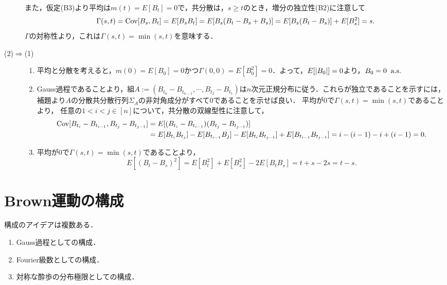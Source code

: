\documentclass[uplatex,dvipdfmx]{jsreport}
\begin{document}
\begin{Proof}
\begin{description}
        また，仮定(B3)より平均は$m(t)=E[B_t]=0$で，共分散は，$s\ge t$のとき，増分の独立性(B2)に注意して
        \[\Gamma(s,t)=\mathrm{Cov}[B_s,B_t]=E[B_sB_t]=E[B_s(B_t-B_s+B_s)]=E[B_s(B_t-B_s)]+E[B_s^2]=s.\]
        $\Gamma$の対称性より，これは$\Gamma(s,t)=\min(s,t)$を意味する．
        \item[(2)$\Rightarrow$(1)]
        \begin{enumerate}[({B}1)]
            \item 平均と分散を考えると，$m(0)=E[B_0]=0$かつ$\Gamma(0,0)=E[B_0^2]=0$．よって，$E[\lvert B_0\rvert]=0$より，$B_0=0\;\;\mathrm{a.s.}$
            \item Gauss過程であることより，組$A:=(B_{t_n}-B_{t_{n-1}},\cdots,B_{t_2}-B_{t_1})$は$n$次元正規分布に従う．これらが独立であることを示すには，補題より$A$の分散共分散行列$\Sigma_A$の非対角成分がすべて$0$であることを示せば良い．
            平均が$0$で$\Gamma(s,t)=\min(s,t)$であることより，
            任意の$1<i< j\in[n]$について，共分散の双線型性に注意して，
            \begin{align*}
                \mathrm{Cov}[B_{t_i}-B_{t_{i-1}},B_{t_j}-B_{t_{j-1}}]&=E[(B_{t_i}-B_{t_{i-1}})(B_{t_j}-B_{t_{j-1}})]\\
                &=E[B_{t_i}B_{t_j}]-E[B_{t_{i-1}}B_j]-E[B_{t_i}B_{t_{j-1}}]+E[B_{t_{i-1}}B_{t_{j-1}}]=i-(i-1)-i+(i-1)=0.
            \end{align*}
            \item 平均が$0$で$\Gamma(s,t)=\min(s,t)$であることより，
            \[E[(B_t-B_s)^2]=E[B_t^2]+E[B_s^2]-2E[B_tB_s]=t+s-2s=t-s.\]
        \end{enumerate}
    \end{description}
\end{Proof}

\section{Brown運動の構成}

\begin{tcolorbox}[colframe=ForestGreen, colback=ForestGreen!10!white,breakable,colbacktitle=ForestGreen!40!white,coltitle=black,fonttitle=\bfseries\sffamily,
    title=]
    構成のアイデアは複数ある．
    \begin{enumerate}
        \item Gauss過程としての構成．
        \item Fourier級数としての構成．
        \item 対称な酔歩の分布極限としての構成．
    \end{enumerate}
\end{tcolorbox}
\end{document}
